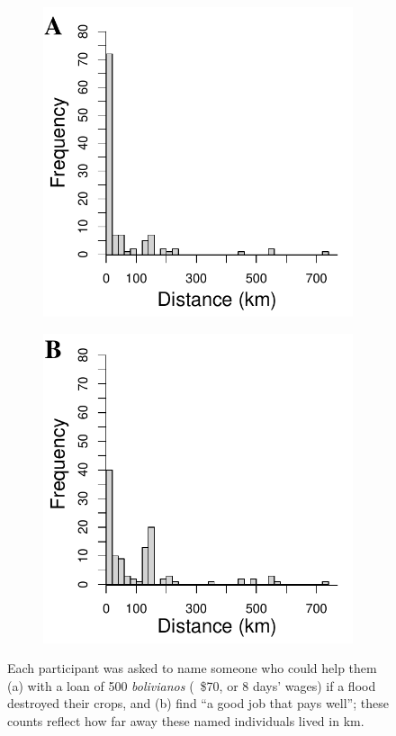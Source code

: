 \documentclass[bibauthoryear]{aa}
\begin{document}
\begin{figure}[t]
	\begin{subfigure}{0.5\columnwidth}
		\includegraphics[width=\linewidth]{FloodHistogram.pdf}
	\end{subfigure}%
	\begin{subfigure}{0.5\columnwidth}
		\includegraphics[width=\linewidth]{WorkHistogram.pdf}
	\end{subfigure}
	\caption{{\footnotesize Each participant was asked to name someone who could help them (a) with a loan of 500 \textit{bolivianos} (~\$70, or 8 days' wages) if a flood destroyed their crops, and (b) find ``a good job that pays well''; these counts reflect how far away these named individuals lived in km.}} \label{boliviaflood}
\end{figure}
\end{document}
